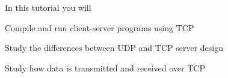 









In this tutorial you will

\DOT Compile and run client-server programs using TCP

\DOT Study the differences between UDP and TCP server design

\DOT Study how data is transmitted and received over TCP


\COPYRIGHT


